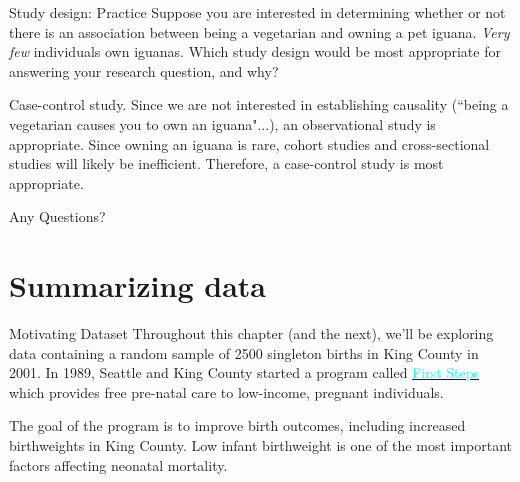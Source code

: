 \documentclass[10pt,t]{beamer}
\begin{document}
\begin{frame}{Study design: Practice}
Suppose you are interested in determining whether or not there is an association between being a vegetarian and owning a pet iguana. \textit{Very few} individuals own iguanas. Which study design would be most appropriate for answering your research question, and why? 

\vspace{0.3cm}

\color{cyan} Case-control study. Since we are not interested in establishing causality (``being a vegetarian causes you to own an iguana"...), an observational study is appropriate. Since owning an iguana is rare, cohort studies and cross-sectional studies will likely be inefficient. Therefore, a case-control study is most appropriate.

\end{frame}

\begin{frame}[c]
\centering \huge Any Questions?
\end{frame}

\section{Summarizing data}


\begin{frame}{Motivating Dataset}
Throughout this chapter (and the next), we'll be exploring data containing a random sample of 2500 singleton births in King County in 2001. In 1989, Seattle and King County started a program called \href{https://kingcounty.gov/depts/health/child-teen-health/maternity-support-infant-case-management.aspx}{\textcolor{cyan}{First Steps}} which provides free pre-natal care to low-income, pregnant individuals. 

\vspace{0.3cm}

The goal of the program is to improve birth outcomes, including increased birthweights in King County. Low infant birthweight is one of the most important factors affecting neonatal mortality. 

\end{frame}
\end{document}
